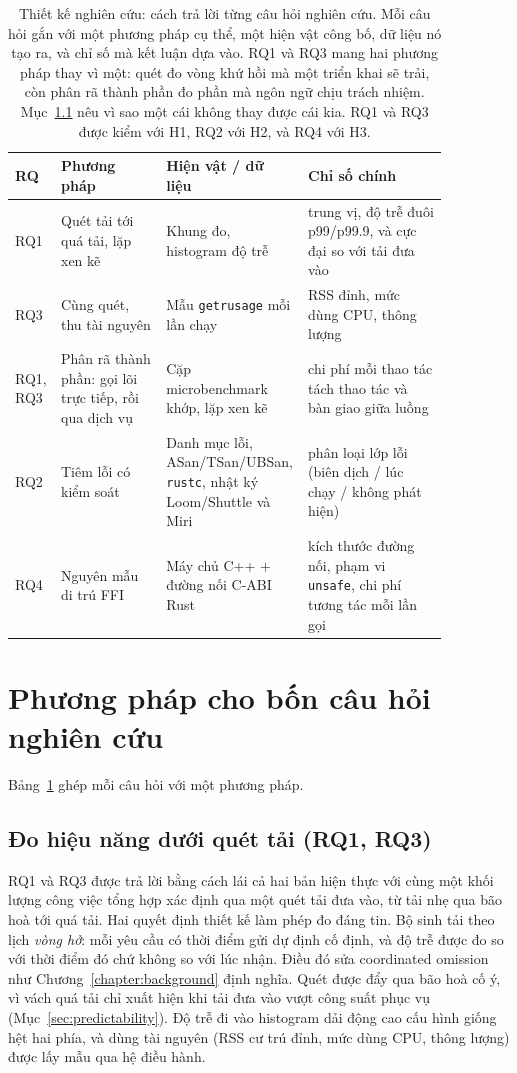 \begin{table}[H]
\centering
\caption[Thiết kế nghiên cứu: cách trả lời từng câu hỏi]{Thiết kế nghiên cứu: cách trả lời từng câu hỏi nghiên cứu. Mỗi câu hỏi gắn với một
phương pháp cụ thể, một hiện vật công bố, dữ liệu nó tạo ra, và chỉ số mà kết luận dựa vào. RQ1
và RQ3 mang hai phương pháp thay vì một: quét đo vòng khứ hồi mà một triển khai sẽ trải, còn phân
rã thành phần đo phần mà ngôn ngữ chịu trách nhiệm. Mục~\ref{sec:methodperf} nêu vì sao một cái
không thay được cái kia. RQ1 và RQ3 được kiểm với H1, RQ2 với H2, và RQ4 với H3.\label{tab:design}}
\renewcommand{\arraystretch}{1.25}
\begin{tabular}{@{}p{0.06\linewidth} p{0.24\linewidth} p{0.24\linewidth} p{0.32\linewidth}@{}}
\hline\hline
RQ & Phương pháp & Hiện vật / dữ liệu & Chỉ số chính \\
\hline
RQ1 & Quét tải tới quá tải, lặp xen kẽ & Khung đo, histogram độ trễ &
trung vị, độ trễ đuôi p99/p99.9, và cực đại so với tải đưa vào \\
RQ3 & Cùng quét, thu tài nguyên & Mẫu \texttt{getrusage} mỗi lần chạy &
RSS đỉnh, mức dùng CPU, thông lượng \\
RQ1, RQ3 & Phân rã thành phần: gọi lõi trực tiếp, rồi qua dịch vụ &
Cặp microbenchmark khớp, lặp xen kẽ &
chi phí mỗi thao tác tách thao tác và bàn giao giữa luồng \\
RQ2 & Tiêm lỗi có kiểm soát & Danh mục lỗi, ASan/TSan/UBSan, \texttt{rustc},
nhật ký Loom/Shuttle và Miri &
phân loại lớp lỗi (biên dịch / lúc chạy / không phát hiện) \\
RQ4 & Nguyên mẫu di trú FFI & Máy chủ C++ $+$ đường nối C-ABI Rust &
kích thước đường nối, phạm vi \texttt{unsafe}, chi phí tương tác mỗi lần gọi \\
\hline
\end{tabular}
\end{table}

\section{Phương pháp cho bốn câu hỏi nghiên cứu}
Bảng~\ref{tab:design} ghép mỗi câu hỏi với một phương pháp.

\subsection{Đo hiệu năng dưới quét tải (RQ1, RQ3)}\label{sec:methodperf}
RQ1 và RQ3 được trả lời bằng cách lái cả hai bản hiện thực với cùng một khối lượng công việc
tổng hợp xác định qua một quét tải đưa vào, từ tải nhẹ qua bão hoà tới quá tải. Hai quyết định
thiết kế làm phép đo đáng tin. Bộ sinh tải theo lịch \emph{vòng hở}: mỗi yêu cầu có thời điểm gửi
dự định cố định, và độ trễ được đo so với thời điểm đó chứ không so với lúc nhận. Điều đó sửa
coordinated omission như Chương~\ref{chapter:background} định nghĩa. Quét được đẩy qua bão hoà
cố ý, vì vách quá tải chỉ xuất hiện khi tải đưa vào vượt công suất phục vụ (Mục~\ref{sec:predictability}).
Độ trễ đi vào histogram dải động cao cấu hình giống hệt hai phía, và dùng tài nguyên (RSS cư
trú đỉnh, mức dùng CPU, thông lượng) được lấy mẫu qua hệ điều hành.

